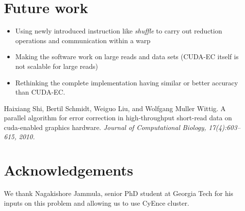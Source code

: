 \documentclass[a0,portrait]{a0poster}
\begin{document}
\begin{multicols}{2}

\color{DarkRed} 
\section*{Future work}
\color{Black} 

\begin{itemize}
\item Using newly introduced instruction like \textit{shuffle} to carry out reduction operations and communication within a warp
\item Making the software work on large reads and data sets (CUDA-EC itself is not scalable for large reads)
\item Rethinking the complete implementation having similar or better accuracy than CUDA-EC.
\end{itemize}

\color{DarkRed}
\begin{thebibliography}{1}
\color{Black}
   Haixiang Shi, Bertil Schmidt, Weiguo Liu, and Wolfgang Muller Wittig. A parallel algorithm for error correction in high-throughput short-read data on cuda-enabled graphics hardware. \em{Journal of Computational Biology}, 17(4):603–615, 2010.
  \end{thebibliography}
  

\color{DarkRed} 
\section*{Acknowledgements}
\color{Black}

We thank Nagakishore Jammula, senior PhD student at Georgia Tech for his inputs on this problem and allowing us to use CyEnce cluster.


\end{multicols}
\end{document}
